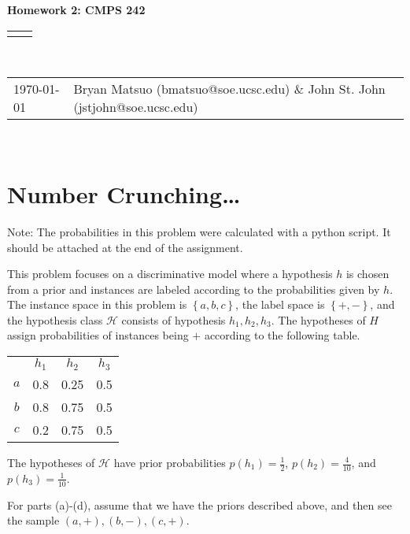 \documentclass[12pt]{article}
\renewcommand{\title}[1]{\textbf{#1}\\}
\renewcommand{\line}{\begin{tabularx}{\textwidth}{X>{\raggedleft}X}\hline\\\end{tabularx}\\[-0.5cm]}
\newcommand{\leftright}[2]{\begin{tabularx}{\textwidth}{X>{\raggedleft}X}#1%
& #2\\\end{tabularx}\\[-0.5cm]}
\begin{document}
\title{Homework 2: CMPS 242}
\line
\leftright{\today}{Bryan Matsuo (bmatsuo@soe.ucsc.edu) \& John St. John (jstjohn@soe.ucsc.edu)} %

\section{Number Crunching\dots}
Note: The probabilities in this problem were calculated with a python script. It should be attached at the end of the assignment.

This problem focuses on a discriminative model where a hypothesis $h$ is chosen from a prior and instances are labeled according to the probabilities given by $h$.
The instance space in this problem is $\left\{ a,b,c \right\}$, the label space is $\left\{ +,- \right\}$, and the hypothesis class $\mathcal{H}$ consists of hypothesis $h_1,h_2,h_3$.
The hypotheses of $H$ assign probabilities of instances being $+$ according to the following table.
\begin{center}
    \begin{tabular}{c c c c}
            & $h_1$ & $h_2$ & $h_3$ \\
        $a$ & 0.8 & 0.25 & 0.5 \\
        $b$ & 0.8 & 0.75 & 0.5 \\
        $c$ & 0.2 & 0.75 & 0.5
    \end{tabular}
\end{center}

The hypotheses of $\mathcal{H}$ have prior probabilities $p(h_1) = \frac{1}{2}$, $p(h_2) = \frac{4}{10}$, and $p(h_3) = \frac{1}{10}$.

For parts (a)-(d), assume that we have the priors described above, and then see the sample $(a,+),(b,-),(c,+)$.
\end{document}
